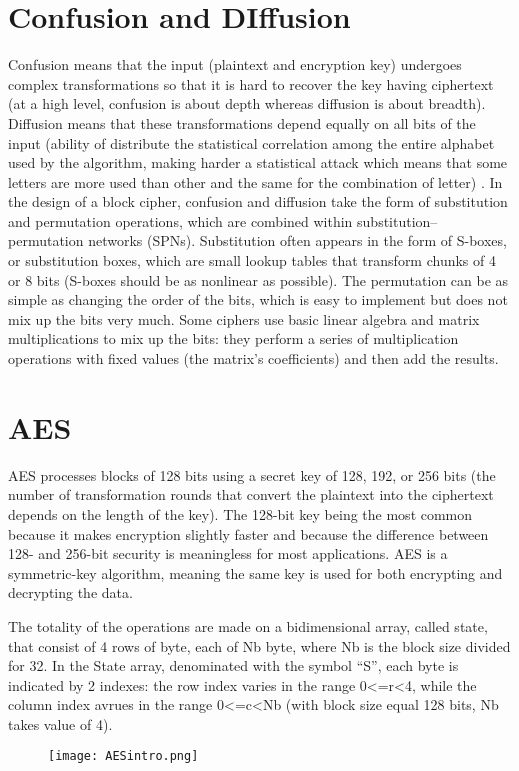 \documentclass{article}
\begin{document}
\newpage
\section{Confusion and DIffusion}
Confusion means that the input (plaintext and encryption key) undergoes complex transformations so that it is hard to recover the key having ciphertext (at a high level, confusion is about depth whereas diffusion is about breadth). 
Diffusion means that these transformations depend equally on all bits of the input (ability of distribute the statistical correlation among the entire alphabet used by the algorithm, making harder a statistical attack which means that some letters are more used than other and the same for the combination of letter) . 
In the design of a block cipher, confusion and diffusion take the form of substitution and permutation operations, which are combined within substitution–permutation networks (SPNs).
Substitution often appears in the form of S-boxes, or substitution boxes, which are small lookup tables that transform chunks of 4 or 8 bits (S-boxes should be as nonlinear as possible).
The permutation can be as simple as changing the order of the bits, which is easy to implement but does not mix up the bits very much. Some ciphers use basic linear algebra and matrix multiplications to mix up the bits: they perform a series of multiplication operations with fixed values (the matrix’s coefficients) and then add the results.
\section{AES}
AES processes blocks of 128 bits using a secret key of 128, 192, or 256 bits (the number of transformation rounds that convert the plaintext into the ciphertext depends on the length of the key). The 128-bit key being the most common because it makes encryption slightly faster and because the difference between 128- and 256-bit security is meaningless for most applications. AES is a symmetric-key algorithm, meaning the same key is used for both encrypting and decrypting the data.

The totality of the operations are made on a bidimensional array, called state, that consist of 4 rows of byte, each of Nb byte, where Nb is the block size divided for 32. In the State array, denominated with the symbol “S”, each byte is indicated by 2 indexes: the row index varies in the range 0<=r<4, while the column index avrues in the range 0<=c<Nb (with block size equal 128 bits, Nb takes value of 4).
\begin{figure}[htb]
	\begin{center}
  		\texttt{[image: AESintro.png]} 
 	\end{center}
\end{figure}
\end{document}
